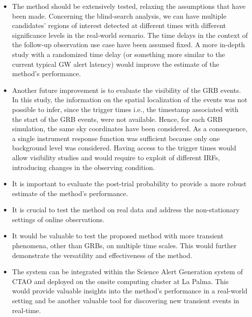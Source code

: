\begin{itemize}
    
    \item The method should be extensively tested, relaxing the assumptions that have been made. Concerning the blind-search analysis, we can have multiple candidates' regions of interest detected at different times with different significance levels in the real-world scenario. The time delays in the context of the follow-up observation use case have been assumed fixed. A more in-depth study with a randomized time delay (or something more similar to the current typical GW alert latency) would improve the estimate of the method's performance.

    \item Another future improvement is to evaluate the visibility of the GRB events. In this study, the information on the spatial localization of the events was not possible to infer, since the trigger times i.e., the timestamp associated with the start of the GRB events, were not available. Hence, for each GRB simulation, the same sky coordinates have been considered. As a consequence, a single instrument response function was sufficient because only one background level was considered. Having access to the trigger times would allow visibility studies and would require to exploit of different IRFs, introducing changes in the observing condition.
    
    \item It is important to evaluate the post-trial probability to provide a more robust estimate of the method's performance. 

    \item It is crucial to test the method on real data and address the non-stationary settings of online observations.
    
    \item It would be valuable to test the proposed method with more transient phenomena, other than GRBs, on multiple time scales. This would further demonstrate the versatility and effectiveness of the method.

    \item The system can be integrated within the Science Alert Generation system of CTAO and deployed on the onsite computing cluster at La Palma. This would provide valuable insights into the method's performance in a real-world setting and be another valuable tool for discovering new transient events in real-time. 
    
\end{itemize}